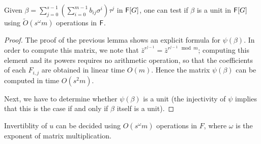 \begin{corollary}
  Given $\beta = \sum_{j = 0}^{s-1} \left( \sum_{i = 0}^{m-1} b_{ij}
  \sigma^i \right) \tau^j$ in ${\mathsf{F}}[G]$, one can test if $\beta$ is a
  unit in ${\mathsf{F}}[G]$ using $\tilde{O}(s^\omega m)$ operations in ${\mathsf{F}}$.
\end{corollary}
\begin{proof}
  The proof of the previous lemma shows an explicit formula for
  $\psi(\beta)$. In order to compute this matrix, we note that
  $\bar{z}^{r^{j-1}} = \bar{z}^{r^{j-1} \mod m}$; computing this
  element and its powers requires no arithmetic operation, so that the
  coefficients of each $F_{i,j}$ are obtained in linear time $O(m)$.
  Hence the matrix $\psi(\beta)$ can be computed in time $O(s^2m)$.

  Next, we have to determine whether $\psi(\beta)$ is a unit (the
  injectivity of $\psi$ implies that this is the case if and only if
  $\beta$ itself is a unit).
\end{proof}

Invertiblity of $u$ can be decided using $O(s^\omega m)$ operations in $F$, where $\omega$ is the
exponent of matrix multiplication.



%

